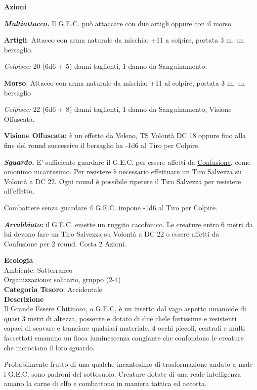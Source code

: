 \begin{multicols}{2}
{\textbf{Azioni}

\emph{\textbf{Multiattacco.}} Il G.E.C. può attaccare con due artigli oppure con il morso

\textbf{Artigli}: Attacco con arma naturale da mischia: +11 a colpire, portata 3 m, un bersaglio.

\emph{Colpisce:} 20 (6d6 + 5) danni taglienti, 1 danno da Sanguinamento.

\textbf{Morso}: Attacco con arma naturale da mischia: +11 al colpire, portata 3 m, un bersaglio

\emph{Colpisce:} 22 (6d6 + 8) danni taglienti, 1 danno da Sanguinamento, Visione Offuscata.

\textbf{Visione Offuscata:} è un effetto da Veleno, TS Volontà DC 18 oppure fino alla fine del round successivo il bersaglio ha -1d6 al Tiro per Colpire.

\emph{\textbf{Sguardo.}} E' sufficiente guardare il G.E.C. per essere affetti da \hyperlink{Confusione}{Confusione}, come omonimo incantesimo. Per resistere è necessario effettuare un Tiro Salvezza su Volontà a DC 22. Ogni round è possibile ripetere il Tiro Salvezza per resistere all'effetto.

Combattere senza guardare il G.E.C. impone -1d6 al Tiro per Colpire.

\emph{\textbf{Arrabbiato:}} il G.E.C. emette un ruggito cacofonico. Le creature entro 6 metri da lui devono fare un Tiro Salvezza su Volontà a DC 22 o essere affetti da Confusione per 2 round. Costa 2 Azioni.

\textbf{Ecologia}\\
Ambiente: Sotterraneo\\
Organizzazione: solitario, gruppo (2-4) \\
\textbf{Categoria Tesoro}: Accidentale\\
\textbf{Descrizione}\\
Il Grande Essere Chitinoso, o G.E.C, è un insetto dal vago aspetto umanoide di quasi 3 metri di altezza, possente e dotato di due chele fortissime e resistenti capaci di scavare e tranciare qualsiasi materiale. 4 occhi piccoli, centrali e multi faccettati emanano un fioca luminescenza cangiante che confondono le creature che incrociano il loro sguardo.

Probabilmente frutto di una qualche incantesimo di trasformazione andato a male i G.E.C. sono padroni del sottosuolo. Creature dotate di una reale intelligenza amano la carne di elfo e combattono in maniera tattica ed accorta.

}
\end{multicols}
